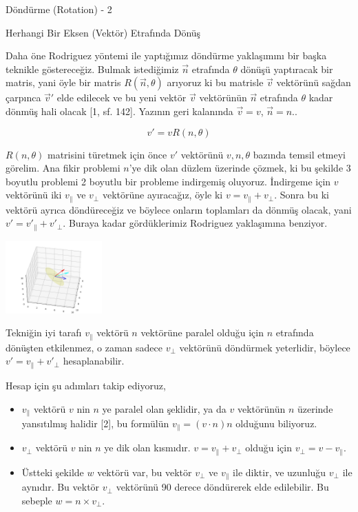 \documentclass[12pt,fleqn]{article}\usepackage{../../common}
\begin{document}
Döndürme (Rotation) - 2

Herhangi Bir Eksen (Vektör) Etrafında Dönüş

Daha öne Rodriguez yöntemi ile yaptığımız döndürme yaklaşımını bir başka
teknikle göstereceğiz. Bulmak istediğimiz $\vec{n}$ etrafında $\theta$ dönüşü
yaptıracak bir matris, yani öyle bir matris $R(\vec{n},\theta)$ arıyoruz ki bu
matrisle $\vec{v}$ vektörünü sağdan çarpınca $\vec{v}'$ elde edilecek ve bu yeni
vektör $\vec{v}$ vektörünün $\vec{n}$ etrafında $\theta$ kadar dönmüş hali
olacak [1, sf. 142]. Yazının geri kalanında $\vec{v} = v$, $\vec{n} = n$.. 

$$
v' = v R(n,\theta)
$$

$R(n,\theta)$ matrisini türetmek için önce $v'$ vektörünü $v,n,\theta$ bazında
temsil etmeyi görelim. Ana fikir problemi $n$'ye dik olan düzlem üzerinde
çözmek, ki bu şekilde 3 boyutlu problemi 2 boyutlu bir probleme indirgemiş
oluyoruz. İndirgeme için $v$ vektörünü iki $v_\parallel$ ve $v_\perp$ vektörüne
ayıracağız, öyle ki $v = v_\parallel + v_\perp$. Sonra bu ki vektörü ayrıca
döndüreceğiz ve böylece onların toplamları da dönmüş olacak, yani $v' =
v'_\parallel + v'_\perp$. Buraya kadar gördüklerimiz Rodriguez yaklaşımına
benziyor.

\includegraphics[width=10em]{phy_073_rot_01.jpg}

Tekniğin iyi tarafı $v_\parallel$ vektörü $n$ vektörüne paralel olduğu için $n$
etrafında dönüşten etkilenmez, o zaman sadece $v_\perp$ vektörünü döndürmek
yeterlidir, böylece $v' = v_\parallel + v'_\perp$ hesaplanabilir.

Hesap için şu adımları takip ediyoruz,

\begin{itemize}
   \item $v_\parallel$ vektörü $v$ nin $n$ ye paralel olan şeklidir, ya da
     $v$ vektörünün $n$ üzerinde yansıtılmış halidir [2], bu formülün
     $v_\parallel = (v \cdot n) n$ olduğunu biliyoruz.
   \item $v_\perp$ vektörü $v$ nin $n$ ye dik olan kısmıdır.
     $v = v_\parallel + v_\perp$ olduğu için $v_\perp = v - v_\parallel$.
   \item Üstteki şekilde $w$ vektörü var, bu vektör $v_\perp$ ve $v_\parallel$
     ile diktir, ve uzunluğu $v_\perp$ ile aynıdır. Bu vektör $v_\perp$
     vektörünü 90 derece döndürerek elde edilebilir. Bu sebeple $w = n \times v_\perp$.
     
\end{itemize}
\end{document}
